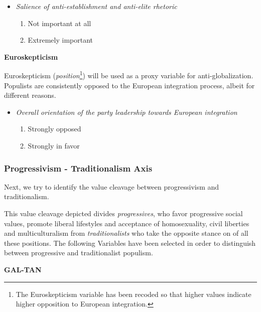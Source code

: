\documentclass[]{article}
\providecommand{\tightlist}{%
  \setlength{\itemsep}{0pt}\setlength{\parskip}{0pt}}
\let\rmarkdownfootnote\footnote%
\def\footnote{\protect\rmarkdownfootnote}
\begin{document}
\begin{itemize}
\tightlist
\item
  \emph{Salience of anti-establishment and anti-elite rhetoric}

  \begin{enumerate}
  \def\labelenumi{\arabic{enumi}.}
  \setcounter{enumi}{-1}
  \tightlist
  \item
    Not important at all
  \item
    Extremely important
  \end{enumerate}
\end{itemize}

\textbf{Euroskepticism}

Euroskepticism (\emph{position}\footnote{The Euroskepticism variable has
  been recoded so that higher values indicate higher opposition to
  European integration.}) will be used as a proxy variable for
anti-globalization. Populists are consistently opposed to the European
integration process, albeit for different reasons.

\begin{itemize}
\tightlist
\item
  \emph{Overall orientation of the party leadership towards European
  integration}

  \begin{enumerate}
  \def\labelenumi{\arabic{enumi}.}
  \tightlist
  \item
    Strongly opposed
  \item
    Strongly in favor
  \end{enumerate}
\end{itemize}

\subsubsection{Progressivism - Traditionalism
Axis}\label{progressivism---traditionalism-axis}

Next, we try to identify the value cleavage between progressivism and
traditionalism.

This value cleavage depicted divides \emph{progressives}, who favor
progressive social values, promote liberal lifestyles and acceptance of
homosexuality, civil liberties and multiculturalism from
\emph{traditionalists} who take the opposite stance on of all these
positions. The following Variables have been selected in order to
distinguish between progressive and traditionalist populism.

\textbf{GAL-TAN}
\end{document}
